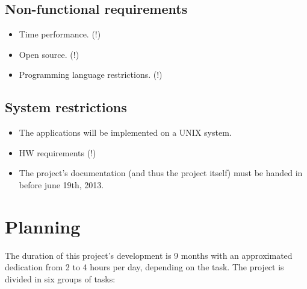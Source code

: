 \documentclass[10pt,a4paper]{report}
\begin{document}
	\section{Non-functional requirements}
		\begin{itemize}
			\item Time performance. (!)
			\item Open source. (!)
			\item Programming language restrictions. (!)
		\end{itemize}
	\section{System restrictions}
		\begin{itemize}
			\item The applications will be implemented on a UNIX system.
			\item HW requirements (!)
			\item The project's documentation (and thus the project itself) must be handed in before june 19th, 2013.
		\end{itemize}
\chapter{Planning}

	The duration of this project's development is 9 months with an approximated dedication from 2 to 4 hours per day, depending on the task. The project is divided in six groups of tasks:
	
\end{document}
